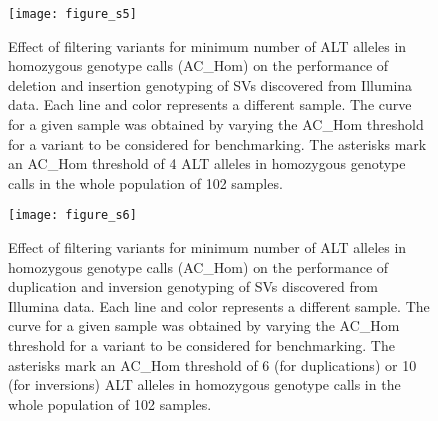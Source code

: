 \documentclass[12pt]{article}
\newenvironment{cfigure}
	{\begin{figure} \centering}
	{\end{figure}}
\begin{document}
\clearpage%

\begin{cfigure}
	\texttt{[image: figure\_s5]}

	\caption[Effect of ALT allele count on genotyping performance of Illumina deletions and insertions]{
		Effect of filtering variants for minimum number of ALT alleles in homozygous genotype calls (AC\_Hom) on the performance of deletion and insertion genotyping of SVs discovered from Illumina data.
		Each line and color represents a different sample.
		The curve for a given sample was obtained by varying the AC\_Hom threshold for a variant to be considered for benchmarking.
		The asterisks mark an AC\_Hom threshold of 4 ALT alleles in homozygous genotype calls in the whole population of 102 samples.
	}

	\label{fig_s5}

\end{cfigure}

\clearpage%

\begin{cfigure}
	\texttt{[image: figure\_s6]}

	\caption[Effect of ALT allele count on genotyping performance of Illumina duplications and inversions]{
		Effect of filtering variants for minimum number of ALT alleles in homozygous genotype calls (AC\_Hom) on the performance of duplication and inversion genotyping of SVs discovered from Illumina data.
		Each line and color represents a different sample.
		The curve for a given sample was obtained by varying the AC\_Hom threshold for a variant to be considered for benchmarking.
		The asterisks mark an AC\_Hom threshold of 6 (for duplications) or 10 (for inversions) ALT alleles in homozygous genotype calls in the whole population of 102 samples.
	}

	\label{fig_s6}

\end{cfigure}

\clearpage%
\end{document}
